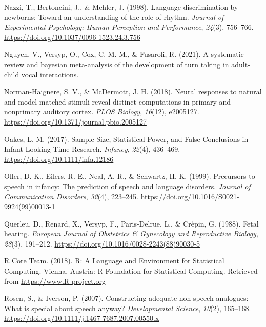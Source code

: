 \documentclass[
  man,mask,floatsintext]{apa6}
\newlength{\cslhangindent}
\newlength{\cslentryspacingunit} %
\newenvironment{CSLReferences}[2] %
 {%
  \setlength{\parindent}{0pt}
  \ifodd #1
  \let\oldpar\par
  \def\par{\hangindent=\cslhangindent\oldpar}
  \fi
  \setlength{\parskip}{#2\cslentryspacingunit}
 }%
 {}
\begin{document}
\begin{CSLReferences}{1}{0}
\leavevmode{}%
Nazzi, T., Bertoncini, J., \& Mehler, J. (1998). Language discrimination by newborns: {Toward} an understanding of the role of rhythm. \emph{Journal of Experimental Psychology: Human Perception and Performance}, \emph{24}(3), 756--766. \url{https://doi.org/10.1037/0096-1523.24.3.756}

\leavevmode{}%
Nguyen, V., Versyp, O., Cox, C. M. M., \& Fusaroli, R. (2021). A systematic review and bayesian meta-analysis of the development of turn taking in adult-child vocal interactions.

\leavevmode{}%
Norman-Haignere, S. V., \& McDermott, J. H. (2018). Neural responses to natural and model-matched stimuli reveal distinct computations in primary and nonprimary auditory cortex. \emph{PLOS Biology}, \emph{16}(12), e2005127. \url{https://doi.org/10.1371/journal.pbio.2005127}

\leavevmode{}%
Oakes, L. M. (2017). Sample {Size}, {Statistical} {Power}, and {False} {Conclusions} in {Infant} {Looking}-{Time} {Research}. \emph{Infancy}, \emph{22}(4), 436--469. \url{https://doi.org/10.1111/infa.12186}

\leavevmode{}%
Oller, D. K., Eilers, R. E., Neal, A. R., \& Schwartz, H. K. (1999). Precursors to speech in infancy: {The} prediction of speech and language disorders. \emph{Journal of Communication Disorders}, \emph{32}(4), 223--245. \url{https://doi.org/10.1016/S0021-9924(99)00013-1}

\leavevmode{}%
Querleu, D., Renard, X., Versyp, F., Paris-Delrue, L., \& Crèpin, G. (1988). Fetal hearing. \emph{European Journal of Obstetrics \& Gynecology and Reproductive Biology}, \emph{28}(3), 191--212. \url{https://doi.org/10.1016/0028-2243(88)90030-5}

\leavevmode{}%
R Core Team. (2018). R: {A} {Language} and {Environment} for {Statistical} {Computing}. Vienna, Austria: R Foundation for Statistical Computing. Retrieved from \url{https://www.R-project.org}

\leavevmode{}%
Rosen, S., \& Iverson, P. (2007). Constructing adequate non-speech analogues: What is special about speech anyway? \emph{Developmental Science}, \emph{10}(2), 165--168. \url{https://doi.org/10.1111/j.1467-7687.2007.00550.x}


\end{CSLReferences}
\end{document}
